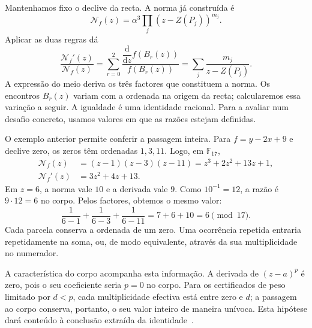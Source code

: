 Mantenhamos fixo o declive da recta. A norma já construída é
\[
 \mathcal N_f(z)=\alpha^3\prod_j(z-Z(P_j))^{m_j}.
\]
Aplicar as duas regras dá
\begin{equation}
 \frac{\mathcal N_f'(z)}{\mathcal N_f(z)}
 =\sum_{r=0}^2
   \frac{\dfrac{\mathrm d}{\mathrm dz}f(B_r(z))}{f(B_r(z))}
 =\sum_j\frac{m_j}{z-Z(P_j)}.
 \label{eq:fcmp-log-derivative}
\end{equation}
A expressão do meio deriva os três factores que constituem a norma.
Os encontros \(B_r(z)\) variam com a ordenada na origem da recta;
calcularemos essa variação a seguir. A igualdade é uma identidade
racional. Para a avaliar num desafio concreto, usamos valores em que
as razões estejam definidas.

O exemplo anterior permite conferir a passagem inteira. Para
\(f=y-2x+9\) e declive zero, os zeros têm ordenadas \(1,3,11\).
Logo, em \(\mathbb F_{17}\),
\begin{align*}
 \mathcal N_f(z)&=(z-1)(z-3)(z-11)
                 =z^3+2z^2+13z+1,\\
 \mathcal N_f'(z)&=3z^2+4z+13.
\end{align*}
Em \(z=6\), a norma vale \(10\) e a derivada vale \(9\).
Como \(10^{-1}=12\), a razão é \(9\cdot12=6\) no corpo.
Pelos factores, obtemos o mesmo valor:
\[
 \frac1{6-1}+\frac1{6-3}+\frac1{6-11}
 =7+6+10=6\pmod {17}.
\]
Cada parcela conserva a ordenada de um zero. Uma ocorrência repetida
entraria repetidamente na soma, ou, de modo equivalente, através da
sua multiplicidade no numerador.

A característica do corpo acompanha esta informação. A derivada de
\((z-a)^p\) é zero, pois o seu coeficiente seria \(p=0\) no
corpo. Para os certificados de peso limitado por \(d<p\), cada
multiplicidade efectiva está entre zero e \(d\); a passagem ao corpo
conserva, portanto, o seu valor inteiro de maneira unívoca. Esta
hipótese dará conteúdo à conclusão extraída da
identidade~\cite{eagen-divisors}.


